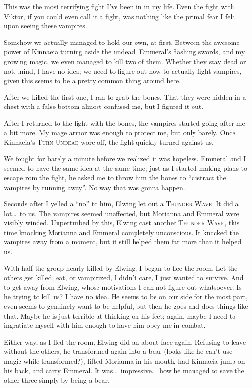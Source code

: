This was the most terrifying fight I've been in in my life. Even the fight with Viktor, if you could even call it a fight, was nothing like the primal fear I felt upon seeing these vampires.

Somehow we actually managed to hold our own, at first. Between the awesome power of Kinnaeia turning aside the undead, Emmeral's flashing swords, and my growing magic, we even managed to kill two of them. Whether they stay dead or not, mind, I have no idea; we need to figure out how to actually fight vampires, given this seems to be a pretty common thing around here.

After we killed the first one, I ran to grab the bones. That they were hidden in a chest with a false bottom almost confused me, but I figured it out.

After I returned to the fight with the bones, the vampires started going after me a bit more. My mage armor was enough to protect me, but only barely. Once Kinnaeia's \textsc{Turn Undead} wore off, the fight quickly turned against us.

We fought for barely a minute before we realized it was hopeless. Emmeral and I seemed to have the same idea at the same time; just as I started making plans to escape rom the fight, he asked me to throw him the bones to ``distract the vampires by running away''. No way that was gonna happen.

Seconds after I yelled a ``no'' to him, Elwing let out a \textsc{Thunder Wave}. It did a lot\dots\ to us. The vampires seemed unaffected, but Morianna and Emmeral were visibly winded. Unperturbed by this, Elwing cast another \textsc{Thunder Wave}, this time knocking Morianna and Emmeral completely unconscious. It knocked the vampires away from a moment, but it still helped them far more than it helped us.

With half the group nearly killed by Elwing, I began to flee the room. Let the others get killed, eat, or vampirized, I didn't care, I just wanted to survive. And to get away from Elwing, whose motivations I can not figure out whatsoever. Is he trying to kill us? I have no idea. He seems to be on our side for the most part, even seems to genuinely want to be helpful, but then he goes and does things like that. Maybe he is just terrible at thinking on his feet; again, maybe I need to ingratiate myself with him enough to have him obey me in combat.

Either way, as I fled the room, Elwing did an about-face again. Refusing to leave without the others, he transformed again into a bear (looks like he can't use magic while transformed?), lifted Morianna in his mouth, had Kinnaeia jump on his back, and carry Emmeral. It was\dots\ impressive\dots\ how he managed to save the other three simply by being a bear.

